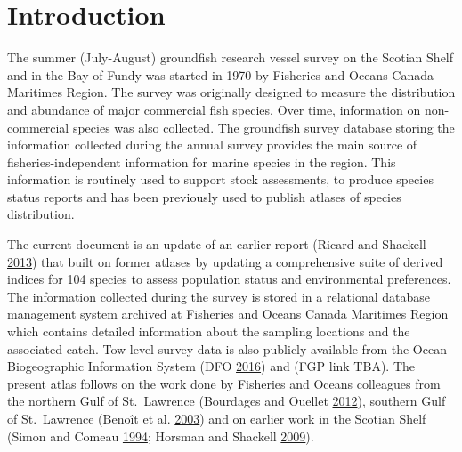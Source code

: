 \documentclass[12pt]{article}\usepackage[]{graphicx}\usepackage[]{color}
\begin{document}

\frontmatter


\renewcommand{\headrulewidth}{0.5pt}  %
\renewcommand{\footrulewidth}{0.5pt}  %

\newcommand{\lt}{\ensuremath <}
\newcommand{\gt}{\ensuremath >}


\hypertarget{sec:introduction}{%
\section{Introduction}\label{sec:introduction}}

The summer (July-August) groundfish research vessel survey on the Scotian Shelf and in the Bay of Fundy was started in 1970 by Fisheries and Oceans Canada Maritimes Region. The survey was originally designed to measure the distribution and abundance of major commercial fish species. Over time, information on non-commercial species was also collected. The groundfish survey database storing the information collected during the annual survey provides the main source of fisheries-independent information for marine species in the region. This information is routinely used to support stock assessments, to produce species status reports and has been previously used to publish atlases of species distribution.

The current document is an update of an earlier report (Ricard and Shackell \protect\hyperlink{ref-Ricard:MARatlas:2013}{2013}) that built on former atlases by updating a comprehensive suite of derived indices for 104 species to assess population status and environmental preferences. The information collected during the survey is stored in a relational database management system archived at Fisheries and Oceans Canada Maritimes Region which contains detailed information about the sampling locations and the associated catch. Tow-level survey data is also publicly available from the Ocean Biogeographic Information System (DFO \protect\hyperlink{ref-DFO:2016}{2016}) and (FGP link TBA). The present atlas follows on the work done by Fisheries and Oceans colleagues from the northern Gulf of St.~Lawrence (Bourdages and Ouellet \protect\hyperlink{ref-Bourdages:NGatlas:2012}{2012}), southern Gulf of St.~Lawrence (Benoît et al. \protect\hyperlink{ref-Benoit:etal:2003:techreport}{2003}) and on earlier work in the Scotian Shelf (Simon and Comeau \protect\hyperlink{ref-Simon:Comeau:1994}{1994}; Horsman and Shackell \protect\hyperlink{ref-Horsman:atlas:2009}{2009}).
\end{document}

